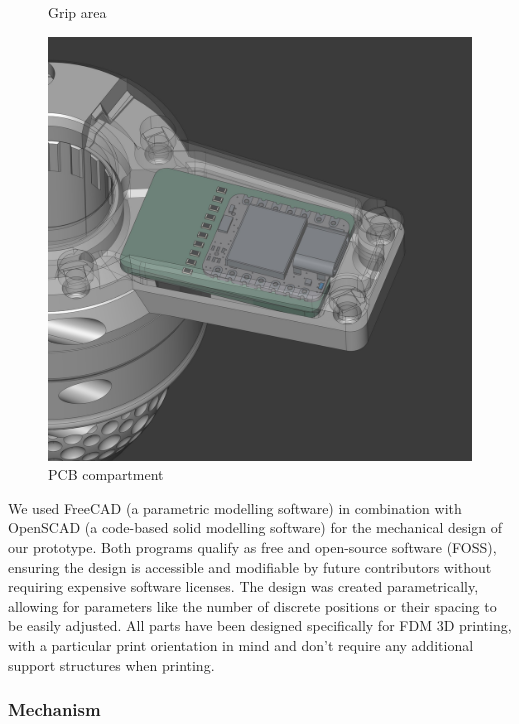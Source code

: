 \begin{figure}[!htb]
\begin{minipage}{.3333\textwidth}
        \caption{Grip area}
        \label{subfig:slicer_textured_grip_area}
    \end{minipage}%
    \begin{minipage}{.3333\textwidth}
        \centering
        \includegraphics[width=.9\linewidth]{images/cad_pcb_compartment.jpg}
        \caption{PCB compartment}
        \label{subfig:cad_pcb_compartment}
    \end{minipage}
\end{figure}

\noindent
We used FreeCAD (a parametric modelling software) in combination with OpenSCAD (a code-based solid modelling software) for the mechanical design of our prototype. Both programs qualify as free and open-source software (FOSS), ensuring the design is accessible and modifiable by future contributors without requiring expensive software licenses.
The design was created parametrically, allowing for parameters like the number of discrete positions or their spacing to be easily adjusted.
All parts have been designed specifically for FDM 3D printing, with a particular print orientation in mind and don't require any additional support structures when printing.

\subsubsection{Mechanism}\label{subsec:mechanism}

